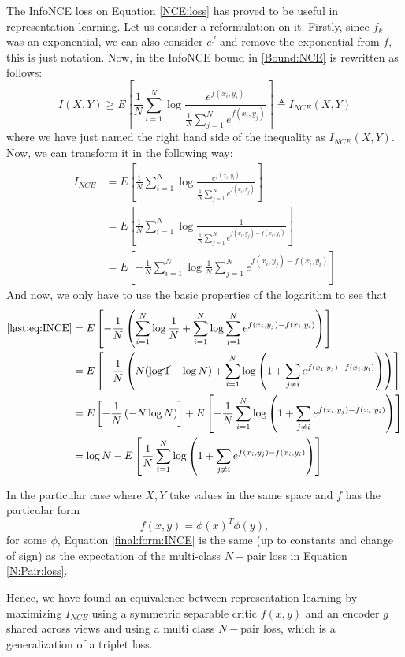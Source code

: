The InfoNCE loss on Equation \eqref{NCE:loss} has proved to be useful in representation learning. Let us consider a reformulation on it. Firstly, since $f_k$ was an exponential, we can also consider $e^f$ and remove the exponential from $f$, this is just notation. Now, in \cite{poole_variational_2019} the InfoNCE bound in \eqref{Bound:NCE} is rewritten as follows:
\[
I(X,Y) \geq E\left[ \frac{1}{N} \sum_{i = 1}^N \log \frac{e^{f(x_i,y_i)}}{\frac{1}{N}\sum_{j=1}^N e^{f(x_i,y_j)}}\right] \triangleq  I_{NCE}(X,Y)
\]
where we have just named the right hand side of the inequality as $I_{NCE}(X,Y)$. Now, we can transform it in the following way:
\begin{align}
I_{NCE}  & = E\left[ \frac{1}{N} \sum_{i = 1}^N \log \frac{e^{f(x_i,y_i)}}{\frac{1}{N}\sum_{j=1}^N e^{f(x_i,y_j)}}\right]\nonumber \\
& = E\left[ \frac{1}{N} \sum_{i = 1}^N \log \frac{1}{\frac{1}{N}\sum_{j=1}^N e^{f(x_i,y_j) - f(x_i,y_i)}}\right]\nonumber \\
& = E\left[ -  \frac{1}{N} \sum_{i = 1}^N \log \frac{1}{N} \sum_{j=1}^N e^{f(x_i,y_j) - f(x_i,y_i)}\right] \label{last:eq:INCE}
\end{align}
And now, we only have to use the basic properties of the logarithm to see that
\begin{align}
\text{\eqref{last:eq:INCE}} & = E\left[-\frac{1}{N}\left(\sum_{i=1}^N \log \frac{1}{N} + \sum_{i=1}^N \log \sum_{j = 1}^N e^{f(x_i,y_j) - f(x_i,y_i)} \right)\right] \nonumber \\
& = E\left[-\frac{1}{N}\left( N(\cancel{\log 1} - \log N ) + \sum_{i=1}^N \log \left( 1  + \sum_{j \neq i} e^{f(x_i,y_j) - f(x_i,y_i)} \right)\right)\right] \nonumber\\ 
& = E\left[-\frac{1}{N}\left(-N\log N\right)\right] + E\left[-\frac{1}{N}\sum_{i=1}^N \log \left( 1  + \sum_{j \neq i} e^{f(x_i,y_j) - f(x_i,y_i)} \right)\right] \nonumber \\
& = \log N - E\left[ \frac{1}{N} \sum_{i=1}^N \log \left( 1+ \sum_{j\neq i}e^{f(x_i,y_j)- f(x_i,y_i)}\right)\right] \label{final:form:INCE}
\end{align}

In the particular case where $X,Y$ take values in the same space and $f$ has the particular form 
\[
f(x,y) = \phi(x)^T \phi(y),  
\]
for some $\phi$, Equation \eqref{final:form:INCE} is the same (up to constants and change of sign) as the expectation of the multi-class $N-$pair loss in Equation \eqref{N:Pair:loss}.

Hence, we have found an equivalence between representation learning by maximizing $I_{NCE}$ using a symmetric separable critic $f(x,y)$ and an encoder $g$ shared across views and using a multi class $N-$pair loss, which is a generalization of a triplet loss.


